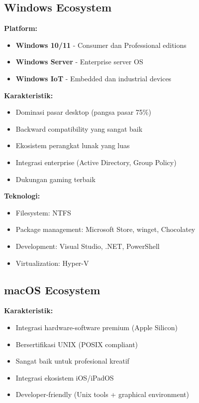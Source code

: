 \subsection{Windows Ecosystem}

\textbf{Platform:}
\begin{itemize}
    \item \textbf{Windows 10/11} - Consumer dan Professional editions
    \item \textbf{Windows Server} - Enterprise server OS
    \item \textbf{Windows IoT} - Embedded dan industrial devices
\end{itemize}

\textbf{Karakteristik:}
\begin{itemize}
    \item Dominasi pasar desktop (pangsa pasar 75\%)
    \item Backward compatibility yang sangat baik
    \item Ekosistem perangkat lunak yang luas
    \item Integrasi enterprise (Active Directory, Group Policy)
    \item Dukungan gaming terbaik
\end{itemize}

\textbf{Teknologi:}
\begin{itemize}
    \item Filesystem: NTFS
    \item Package management: Microsoft Store, winget, Chocolatey
    \item Development: Visual Studio, .NET, PowerShell
    \item Virtualization: Hyper-V
\end{itemize}

\subsection{macOS Ecosystem}

\textbf{Karakteristik:}
\begin{itemize}
    \item Integrasi hardware-software premium (Apple Silicon)
    \item Bersertifikasi UNIX (POSIX compliant)
    \item Sangat baik untuk profesional kreatif
    \item Integrasi ekosistem iOS/iPadOS
    \item Developer-friendly (Unix tools + graphical environment)
\end{itemize}

